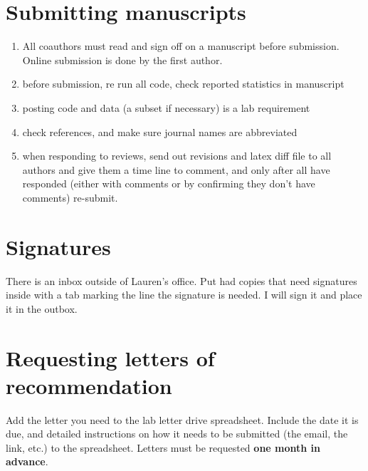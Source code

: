 \documentclass[12pt]{article}
\begin{document}
\section{Submitting manuscripts}
\begin{enumerate}
\item All coauthors must read and sign off on a manuscript before
  submission. Online submission is done by the first author. 
\item before submission, re run all code, check reported statistics in
  manuscript
\item posting code and data (a subset if necessary) is a lab
  requirement
\item check references, and make sure journal names are abbreviated
\item when responding to reviews, send out revisions and latex diff
  file to all authors and give them a time line to comment, and only
  after all have responded (either with comments or by confirming they
  don't have comments) re-submit. 
\end{enumerate}

\section{Signatures}
There is an inbox outside of Lauren's office. Put had copies that need
signatures inside with a tab marking the line the signature is
needed. I will sign it and place it in the outbox.

\section{Requesting letters of recommendation}
Add the letter you need to the lab letter drive spreadsheet. Include
the date it is due, and detailed instructions on how it needs to be
submitted (the email, the link, etc.) to the spreadsheet. Letters must
be requested \textbf{one month in advance}. 
\end{document}
